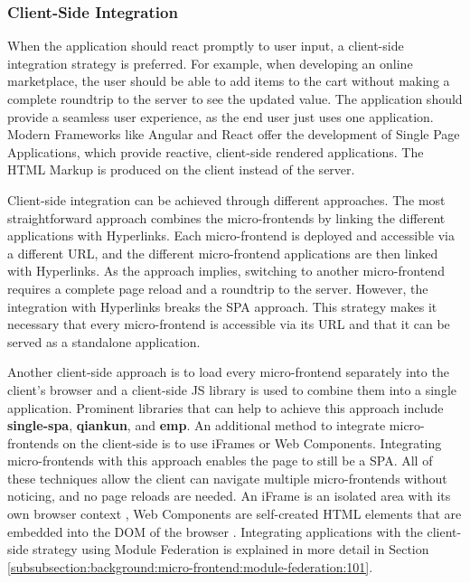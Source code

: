 \subsubsection{Client-Side Integration}\label{subsubsection:background:micro-frontend-architecture:integration-strategies:client-side-integration}

When the application should react promptly to user input, a client-side integration strategy is preferred. For example, when developing an online marketplace, the user should be able to add items to the cart without making a complete roundtrip to the server to see the updated value. The application should provide a seamless user experience, as the end user just uses one application. Modern Frameworks like Angular and React offer the development of Single Page Applications, which provide reactive, client-side rendered applications. The \ac{HTML} Markup is produced on the client instead of the server. \cite{book:2020:geers:background:micro-frontends:micro-frontends-in-action}

\bigskip

\noindent Client-side integration can be achieved through different approaches. The most straightforward approach combines the micro-frontends by linking the different applications with Hyperlinks. Each micro-frontend is deployed and accessible via a different \ac{URL}, and the different micro-frontend applications are then linked with Hyperlinks. As the approach implies, switching to another micro-frontend requires a complete page reload and a roundtrip to the server. However, the integration with Hyperlinks breaks the \ac{SPA} approach. This strategy makes it necessary that every micro-frontend is accessible via its \ac{URL} and that it can be served as a standalone application.

\bigskip

\noindent Another client-side approach is to load every micro-frontend separately into the client's browser and a client-side \ac{JS} library is used to combine them into a single application. Prominent libraries that can help to achieve this approach include \textbf{single-spa}, \textbf{qiankun}, and \textbf{emp}. An additional method to integrate micro-frontends on the client-side is to use iFrames or Web Components. Integrating micro-frontends with this approach enables the page to still be a \ac{SPA}. All of these techniques allow the client can navigate multiple micro-frontends without noticing, and no page reloads are needed. An iFrame is an isolated area with its own browser context \cite[35]{book:2020:geers:background:micro-frontends:micro-frontends-in-action}, Web Components are self-created \ac{HTML} elements that are embedded into the DOM of the browser \cite[103]{book:2019:farrell:background:micro-frontends:web-components-in-action}. Integrating applications with the client-side strategy using Module Federation is explained in more detail in Section \ref{subsubsection:background:micro-frontend:module-federation:101}.
